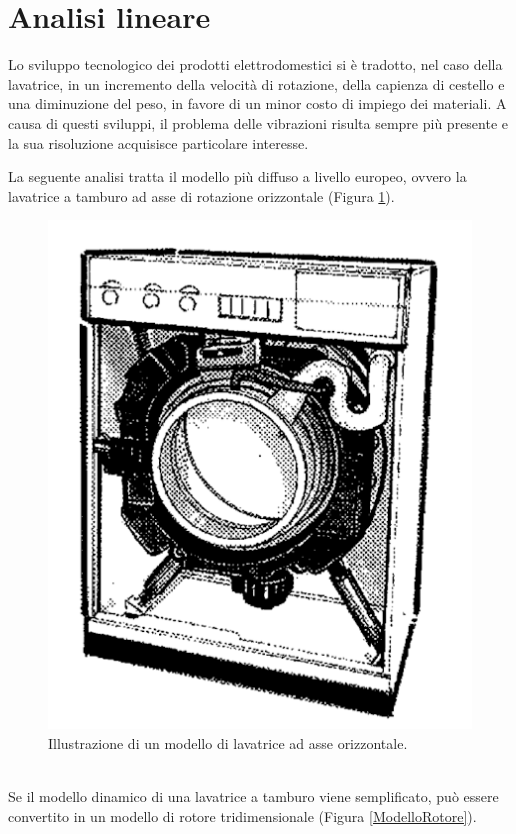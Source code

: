 \section{Analisi lineare}
Lo sviluppo tecnologico dei prodotti elettrodomestici si è tradotto, nel caso della lavatrice, in un incremento della velocità di rotazione, della capienza di cestello e una diminuzione del peso, in favore di un minor costo di impiego dei materiali. A causa di questi sviluppi, il problema delle vibrazioni risulta sempre più presente e la sua risoluzione acquisisce particolare interesse.

La seguente analisi tratta il modello più diffuso a livello europeo, ovvero la lavatrice a tamburo ad asse di rotazione orizzontale (Figura \ref{LavatriceAsseOrizzontale}).
\begin{figure}[h]
    \centering
    \includegraphics[scale=0.5]{LavatriceOrizzontale.png}
    \caption{Illustrazione di un modello di lavatrice ad asse orizzontale.}
    \label{LavatriceAsseOrizzontale}
\end{figure}\\
Se il modello dinamico di una lavatrice a tamburo viene semplificato, può essere convertito in un modello di rotore tridimensionale (Figura \ref{ModelloRotore})\cite{choi2003study}.
